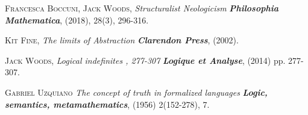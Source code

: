 \documentclass[bsl,meeting]{asl}
\begin{document}
\begin{thebibliography}{10}

{\scshape Francesca Boccuni, Jack Woods},
{\itshape Structuralist Neologicism} 
{\bfseries\itshape Philosophia Mathematica}, (2018), 28(3), 296-316.

{\scshape Kit Fine},
{\itshape The limits of Abstraction}
{\bfseries\itshape Clarendon Press}, (2002).

{\scshape Jack Woods},
{\itshape Logical indefinites , 277-307}
{\bfseries\itshape Logique et Analyse}, (2014) pp. 277-307.

{\scshape Gabriel Uzquiano}
{\itshape The concept of truth in formalized languages}
{\bfseries\itshape Logic, semantics, metamathematics}, (1956) 2(152-278), 7.


\end{thebibliography}


\vspace*{-0.5\baselineskip}
\end{document}
